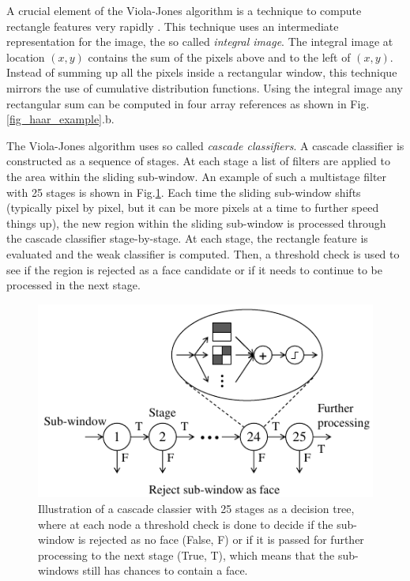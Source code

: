 \documentclass[conference]{IEEEtran}
\begin{document}
A crucial element of the Viola-Jones algorithm is a technique to compute rectangle features very rapidly \cite{viola-2001,wang-2014}. This technique uses an intermediate representation for the image, the so called {\it integral image}. 
The integral image at location $(x,y)$ contains the sum of the pixels above and to the left of $(x,y)$.
Instead of summing up all the pixels inside a rectangular window, this technique mirrors the use of cumulative distribution functions.  Using the integral image any rectangular sum can be computed in four array references as shown in Fig.\ref{fig_haar_example}.b.


The Viola-Jones algorithm uses so called {\it cascade classifiers}. A cascade classifier is constructed as a sequence of stages. At each stage a list of filters are applied to the area within the sliding sub-window. An example of such a multistage filter with 25 stages is shown in Fig.\ref{fig_cascade_classifier}. Each time the sliding sub-window shifts (typically pixel by pixel, but it can be more pixels at a time to further speed things up), the new region within the sliding sub-window is processed through the cascade classifier stage-by-stage. At each stage, the rectangle feature is evaluated and the weak classifier is computed. Then, a threshold check is used to see if the region is rejected as a face candidate or if it needs to continue to be processed in the next stage.


\begin{figure}[!htb]
\centering
	\includegraphics[scale=1.0]{fig_cascade_classifier}
\caption{Illustration of a cascade classier with 25 stages as a decision tree, where at each node a threshold check is done to decide if the sub-window is rejected as no face (False, F) or if it is passed for further processing to the next stage (True, T), which means that the sub-windows still has chances to contain a face.}
\label{fig_cascade_classifier}
\end{figure}
\end{document}
